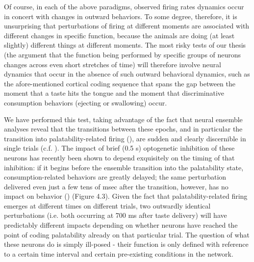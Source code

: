 \begin{refsection}
Of course, in each of the above paradigms, observed firing rates dynamics occur in concert with changes in outward behaviors. To some degree, therefore, it is unsurprising that perturbations of firing at different moments are associated with different changes in specific function, because the animals are doing (at least slightly) different things at different moments. The most risky tests of our thesis (the argument that the function being performed by specific groups of neurons changes across even short stretches of time) will therefore involve neural dynamics that occur in the absence of such outward behavioral dynamics, such as the afore-mentioned cortical coding sequence that spans the gap between the moment that a taste hits the tongue and the moment that discriminative consumption behaviors (ejecting or swallowing) occur.

We have performed this test, taking advantage of the fact that neural ensemble analyses reveal that the transitions between these epochs, and in particular the transition into palatability-related firing (\cite{sadacca2016a}), are sudden and clearly discernible in single trials (c.f. \cite{jones2007a}). The impact of brief (0.5 s) optogenetic inhibition of these neurons has recently been shown to depend exquisitely on the timing of that inhibition: if it begins before the ensemble transition into the palatability state, consumption-related behaviors are greatly delayed; the same perturbation delivered even just a few tens of msec after the transition, however, has no impact on behavior (\cite{mukherjee2019a}) (Figure 4.3). Given the fact that palatability-related firing emerges at different times on different trials, two outwardly identical perturbations (i.e. both occurring at 700 ms after taste delivery) will have predictably different impacts depending on whether neurons have reached the point of coding palatability already on that particular trial. The question of what these neurons do is simply ill-posed - their function is only defined with reference to a certain time interval and certain pre-existing conditions in the network.


\end{refsection}

